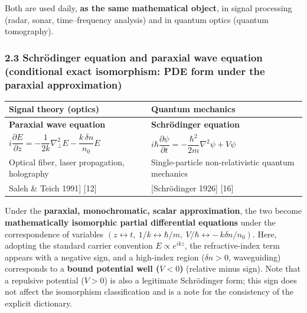 \documentclass[
]{article}
\newcounter{none} %
\begin{document}
Both are used daily, \textbf{as the same mathematical object}, in signal
processing (radar, sonar, time--frequency analysis) and in quantum
optics (quantum tomography).

\subsubsection{2.3 Schrödinger equation and paraxial wave equation
(conditional exact isomorphism: PDE form under the paraxial
approximation)}\label{schruxf6dinger-equation-and-paraxial-wave-equation-conditional-exact-isomorphism-pde-form-under-the-paraxial-approximation}

{\def\LTcaptype{none} %
\begin{longtable}[]{@{}
  >{\raggedright\arraybackslash}p{}
  >{\raggedright\arraybackslash}p{}@{}}
\toprule\noalign{}
\begin{minipage}[b]{\linewidth}\raggedright
Signal theory (optics)
\end{minipage} & \begin{minipage}[b]{\linewidth}\raggedright
Quantum mechanics
\end{minipage} \\
\midrule\noalign{}
\endhead
\bottomrule\noalign{}
\endlastfoot
\textbf{Paraxial wave equation} & \textbf{Schrödinger equation} \\
\(i\dfrac{\partial E}{\partial z} = -\dfrac{1}{2k}\nabla_\perp^2 E - \dfrac{k\,\delta n}{n_0}E\)
&
\(i\hbar \dfrac{\partial \psi}{\partial t} = -\dfrac{\hbar^2}{2m}\nabla^2 \psi + V\psi\) \\
Optical fiber, laser propagation, holography & Single-particle
non-relativistic quantum mechanics \\
{[}Saleh \& Teich 1991{]} {[}12{]} & {[}Schrödinger 1926{]} {[}16{]} \\
\end{longtable}
}

Under the \textbf{paraxial, monochromatic, scalar approximation}, the
two become \textbf{mathematically isomorphic partial differential
equations} under the correspondence of variables
\((z \leftrightarrow t,\ 1/k \leftrightarrow \hbar/m,\ V/\hbar \leftrightarrow -\,k\delta n/n_0)\).
Here, adopting the standard carrier convention \(E\propto e^{ikz}\), the
refractive-index term appears with a negative sign, and a high-index
region (\(\delta n>0\), waveguiding) corresponds to a \textbf{bound
potential well (\(V<0\))} (relative minus sign). Note that a repulsive
potential (\(V>0\)) is also a legitimate Schrödinger form; this sign
does not affect the isomorphism classification and is a note for the
consistency of the explicit dictionary.
\end{document}
